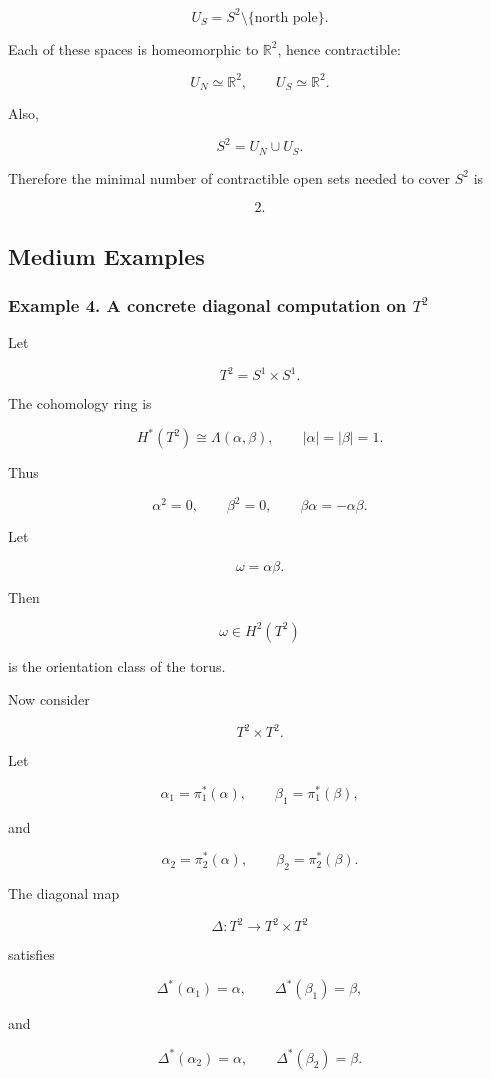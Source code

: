 \documentclass[12pt,a4paper]{article}
\theoremstyle{notespace}
\begin{document}
\[
U_S=S^2\setminus \{\text{north pole}\}.
\]

Each of these spaces is homeomorphic to \(\mathbb R^2\), hence contractible:

\[
U_N\simeq \mathbb R^2,
\qquad
U_S\simeq \mathbb R^2.
\]

Also,

\[
S^2=U_N\cup U_S.
\]

Therefore the minimal number of contractible open sets needed to cover \(S^2\) is

\[
\boxed{2.}
\]

\subsection{Medium Examples}

\subsubsection{Example 4. A concrete diagonal computation on \(T^2\)}

Let

\[
T^2=S^1\times S^1.
\]

The cohomology ring is

\[
H^*(T^2)
\cong
\Lambda(\alpha,\beta),
\qquad
|\alpha|=|\beta|=1.
\]

Thus

\[
\alpha^2=0,
\qquad
\beta^2=0,
\qquad
\beta\alpha=-\alpha\beta.
\]

Let

\[
\omega=\alpha\beta.
\]

Then

\[
\omega\in H^2(T^2)
\]

is the orientation class of the torus.

Now consider

\[
T^2\times T^2.
\]

Let

\[
\alpha_1=\pi_1^*(\alpha),
\qquad
\beta_1=\pi_1^*(\beta),
\]

and

\[
\alpha_2=\pi_2^*(\alpha),
\qquad
\beta_2=\pi_2^*(\beta).
\]

The diagonal map

\[
\Delta:T^2\to T^2\times T^2
\]

satisfies

\[
\Delta^*(\alpha_1)=\alpha,
\qquad
\Delta^*(\beta_1)=\beta,
\]

and

\[
\Delta^*(\alpha_2)=\alpha,
\qquad
\Delta^*(\beta_2)=\beta.
\]
\end{document}
